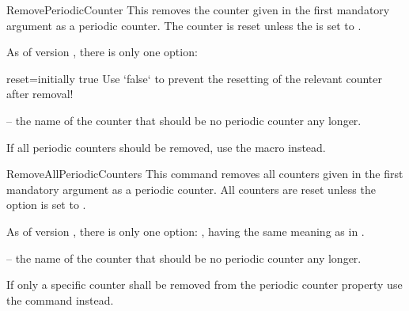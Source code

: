\documentclass[12pt,a4paper,oneside]{article}
\makeatletter
\newcommand{\chdocextractversion}[1]{%
  \@nameuse{#1}%
}
\newcommand{\CHDocNew}[1]{%
  \tcbdocmarginnote[doclang/new={N},
  colframe=blue,
  halign=left,
  colback={blue!20!white},
  fontupper={\tiny}
  ]{%
    \chdocextractversion{xassoccntversion#1}%
  }%
}
\def\packageversion{\xassoccntpackageversion}%
\makeatother
\begin{document}
\begin{docCommand}[before={\CHDocNew{0.9}}]{RemovePeriodicCounter}{}
This removes the counter given in the first mandatory argument as a periodic counter. The counter is reset unless the  is set to . 

\begin{codeoptionsenum}
\item {} 

  As of version \packageversion, there is only one option: 
  
  \begin{docKey}[][before={\CHDocNew{0.9}}]{reset}{=}{initially true}
      Use `false` to prevent the resetting of the relevant counter after removal! 
    \end{docKey}
  \item {} -- the name of the counter that should be no periodic counter any longer. 
\end{codeoptionsenum}

If all periodic counters should be removed, use the macro  instead. 

\end{docCommand}

\begin{docCommand}[before={\CHDocNew{1.0}}]{RemoveAllPeriodicCounters}{}
  This command removes all counters given in the first mandatory argument as a periodic counter. All counters are reset unless the  option is set to . 

\begin{codeoptionsenum}
\item {} 
  As of version \packageversion, there is only one option: , having the same meaning as in .
\item {} -- the name of the counter that should be no periodic counter any longer. 
\end{codeoptionsenum}

If only a specific counter shall be removed from the periodic counter property use the command  instead. 

\end{docCommand}
\end{document}

